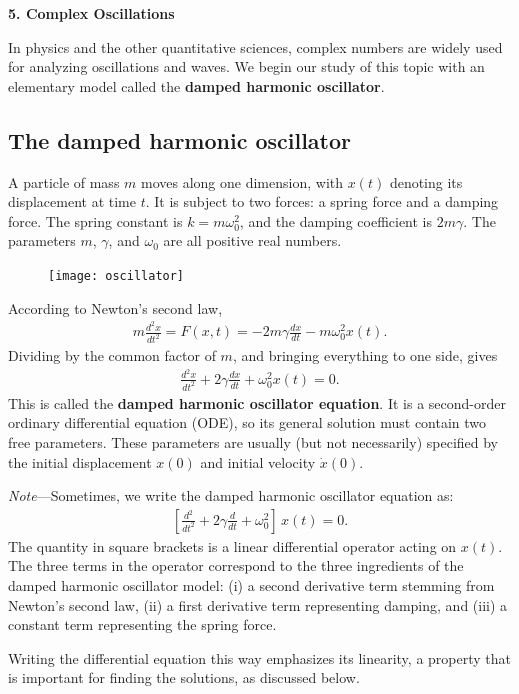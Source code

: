 \documentclass[10pt,a4paper]{article}
\begin{document}
\setcounter{page}{31}

\noindent
{\Large \textbf{5. Complex Oscillations}}
\vskip 0.2in

\label{complex-oscillations}

In physics and the other quantitative sciences, complex numbers are
widely used for analyzing oscillations and waves. We begin our study
of this topic with an elementary model called the \textbf{damped
  harmonic oscillator}.

\subsection{The damped harmonic oscillator}
\label{the-damped-harmonic-oscillator}

A particle of mass $m$ moves along one dimension, with $x(t)$ denoting
its displacement at time $t$. It is subject to two forces: a spring
force and a damping force. The spring constant is $k = m\omega_0^2$,
and the damping coefficient is $2m \gamma$.  The parameters $m$,
$\gamma$, and $\omega_0$ are all positive real numbers.

\begin{figure}[ht]
  \centering\texttt{[image: oscillator]}
\end{figure}

According to Newton's second law,
\begin{align}
  m \frac{d^2 x}{dt^2} = F(x,t) = - 2m\gamma \frac{dx}{dt} - m\omega_0^2 x(t).
\end{align}
Dividing by the common factor of $m$, and bringing everything to one
side, gives
\begin{align}
  \frac{d^2 x}{dt^2} + 2\gamma \frac{dx}{dt} + \omega_0^2 x(t) = 0.
\end{align}
This is called the \textbf{damped harmonic oscillator equation}. It is
a second-order ordinary differential equation (ODE), so its general
solution must contain two free parameters. These parameters are
usually (but not necessarily) specified by the initial displacement
$x(0)$ and initial velocity $\dot{x}(0)$.

\begin{framed}\noindent
  \textit{Note}---Sometimes, we write the damped harmonic oscillator
  equation as:
  \begin{align}
    \left[\frac{d^2}{dt^2} + 2\gamma \frac{d}{dt} + \omega_0^2 \right]\, x(t) = 0.
  \end{align}
  The quantity in square brackets is a linear differential operator acting on $x(t)$.  The three terms in the operator correspond to the three ingredients of the damped harmonic oscillator model: (i) a second derivative term stemming from Newton's second law, (ii) a first derivative term representing damping, and (iii) a constant term representing the spring force.

  Writing the differential equation this way emphasizes its linearity,
  a property that is important for finding the solutions, as discussed
  below.
\end{framed}
\end{document}
